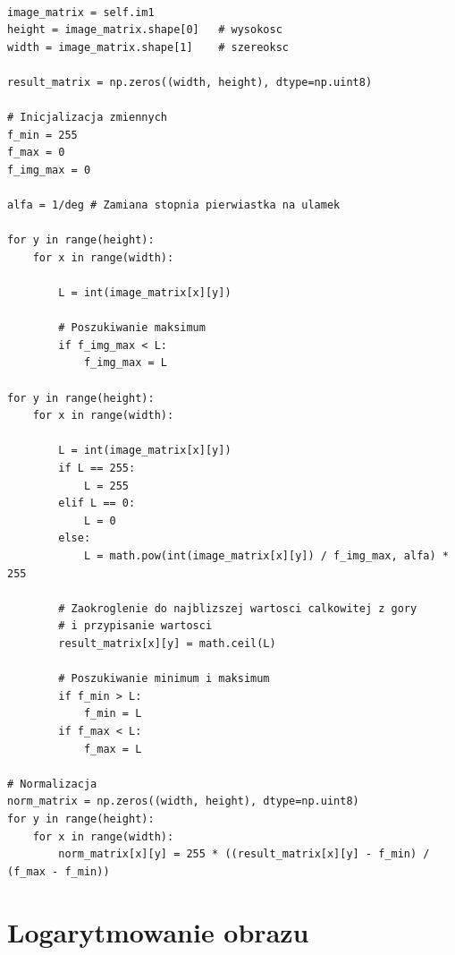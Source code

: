 \documentclass[final,a4paper,openany,12pt]{mwbk}
\begin{document}
\begin{lstlisting}[caption=Pierwiastkowanie obrazu szarego]

image_matrix = self.im1
height = image_matrix.shape[0]   # wysokosc
width = image_matrix.shape[1]    # szereoksc

result_matrix = np.zeros((width, height), dtype=np.uint8)

# Inicjalizacja zmiennych
f_min = 255
f_max = 0
f_img_max = 0

alfa = 1/deg # Zamiana stopnia pierwiastka na ulamek

for y in range(height):
    for x in range(width):  
        
        L = int(image_matrix[x][y])

        # Poszukiwanie maksimum
        if f_img_max < L:
            f_img_max = L

for y in range(height):
    for x in range(width):  
        
        L = int(image_matrix[x][y])
        if L == 255:
            L = 255
        elif L == 0:
            L = 0
        else:
            L = math.pow(int(image_matrix[x][y]) / f_img_max, alfa) * 255

        # Zaokroglenie do najblizszej wartosci calkowitej z gory
        # i przypisanie wartosci
        result_matrix[x][y] = math.ceil(L)

        # Poszukiwanie minimum i maksimum
        if f_min > L:
            f_min = L
        if f_max < L:
            f_max = L

# Normalizacja
norm_matrix = np.zeros((width, height), dtype=np.uint8)
for y in range(height):
    for x in range(width):
        norm_matrix[x][y] = 255 * ((result_matrix[x][y] - f_min) / (f_max - f_min))

\end{lstlisting}

\section {Logarytmowanie obrazu}

\hfill
\\\\
\indent
\end{document}
